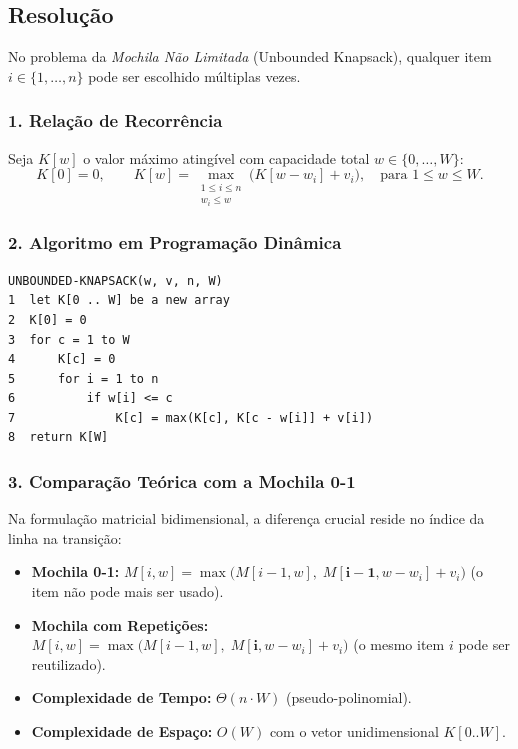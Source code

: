 \documentclass[11pt,a4paper]{article}
\begin{document}
\subsection*{Resolução}

No problema da \emph{Mochila Não Limitada} (Unbounded Knapsack), qualquer item $i \in \{1, \dots, n\}$ pode ser escolhido múltiplas vezes. 

\subsubsection*{1. Relação de Recorrência}
Seja $K[w]$ o valor máximo atingível com capacidade total $w \in \{0, \dots, W\}$:
\begin{equation}
K[0] = 0, \qquad K[w] = \max_{\substack{1 \le i \le n \\ w_i \le w}} \Big( K[w - w_i] + v_i \Big), \quad \text{para } 1 \le w \le W.
\end{equation}

\subsubsection*{2. Algoritmo em Programação Dinâmica}

\begin{lstlisting}
UNBOUNDED-KNAPSACK(w, v, n, W)
1  let K[0 .. W] be a new array
2  K[0] = 0
3  for c = 1 to W
4      K[c] = 0
5      for i = 1 to n
6          if w[i] <= c
7              K[c] = max(K[c], K[c - w[i]] + v[i])
8  return K[W]
\end{lstlisting}

\subsubsection*{3. Comparação Teórica com a Mochila 0-1}
Na formulação matricial bidimensional, a diferença crucial reside no índice da linha na transição:
\begin{itemize}
    \item \textbf{Mochila 0-1:} $M[i, w] = \max\Big(M[i-1, w], \; M[\mathbf{i-1}, w - w_i] + v_i\Big)$ (o item não pode mais ser usado).
    \item \textbf{Mochila com Repetições:} $M[i, w] = \max\Big(M[i-1, w], \; M[\mathbf{i}, w - w_i] + v_i\Big)$ (o mesmo item $i$ pode ser reutilizado).
\end{itemize}
\begin{itemize}
    \item \textbf{Complexidade de Tempo:} $\Theta(n \cdot W)$ (pseudo-polinomial).
    \item \textbf{Complexidade de Espaço:} $O(W)$ com o vetor unidimensional $K[0..W]$.
\end{itemize}
\end{document}
